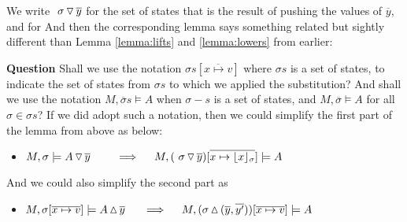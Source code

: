 \vspace{.2cm}

\vspace{.2cm}

We write $ \ {\sigma} \, {\triangledown}\, \overline{y} $ for the set of states that is the result of pushing the values of $\overline y$,
and for 
 And then the corresponding lemma says something related but sightly different than Lemma \ref{lemma:lifts} and \ref{lemma:lowers} from earlier:




\vspace{.2cm}
\textbf{Question} Shall we use the notation $\sigma s[ \overline{x \mapsto v}]$ where $ \sigma s$ is a set of states, to indicate the set of states from $\sigma s$ to which we applied the substitution?
And shall we use the notation 
$M, \overline \sigma s \models A$ when $\sigma-s$ is a set of states, and  $M, \overline \sigma \models A$ for all $\sigma \in \sigma s$?
 If we did adopt  such a notation,  then we could  simplify the first part of the  lemma from above as below:

\begin{itemize}
 \item
$M, \sigma \models \PushAS {y} {A}\ \ \ \ \ \ \   \Longrightarrow  \ \ \ \ M,  (\PushS {y} {\sigma})[\overline{x \mapsto {\interpret {\sigma} {x}} } ] \models A$
\end{itemize}
 

\noindent
And we could also simplify the second part as
\begin{itemize}
 \item
$M, \sigma[\overline {x \mapsto v}]  \models \PopAS  {y} {A}\ \  \ \ \ \Longrightarrow  \ \ \ \ M,  (\PopSLong  {(\overline y, \overline {y'})} {\sigma})[\overline {x \mapsto v}]  \models A$
\end{itemize}


